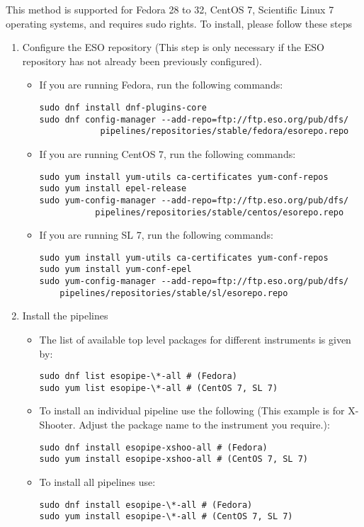  This method is supported for Fedora 28 to 32, CentOS 7,
 Scientific Linux 7 operating systems, and requires sudo rights. To install, please follow these steps

\begin{enumerate}

\item Configure the ESO repository (This step is only necessary if the ESO repository has not already been previously configured).
  \begin{itemize}
  \item If you are running Fedora, run the following commands:
\begin{verbatim}
sudo dnf install dnf-plugins-core
sudo dnf config-manager --add-repo=ftp://ftp.eso.org/pub/dfs/
            pipelines/repositories/stable/fedora/esorepo.repo
\end{verbatim}
\item If you are running CentOS 7, run the following commands:
\begin{verbatim}
sudo yum install yum-utils ca-certificates yum-conf-repos
sudo yum install epel-release
sudo yum-config-manager --add-repo=ftp://ftp.eso.org/pub/dfs/
           pipelines/repositories/stable/centos/esorepo.repo
\end{verbatim}
\item If you are running SL 7, run the following commands:
\begin{verbatim}
sudo yum install yum-utils ca-certificates yum-conf-repos
sudo yum install yum-conf-epel
sudo yum-config-manager --add-repo=ftp://ftp.eso.org/pub/dfs/
    pipelines/repositories/stable/sl/esorepo.repo
\end{verbatim}
  \end{itemize}

\item Install the pipelines
\begin{itemize}
\item The list of available top level packages for different instruments is given by:
\begin{verbatim}
sudo dnf list esopipe-\*-all # (Fedora)
sudo yum list esopipe-\*-all # (CentOS 7, SL 7)
\end{verbatim}
 
\item To install an individual pipeline use the following (This example is for X-Shooter. Adjust the package name to the instrument you require.):
\begin{verbatim}
sudo dnf install esopipe-xshoo-all # (Fedora)
sudo yum install esopipe-xshoo-all # (CentOS 7, SL 7)
\end{verbatim}

\item To install all pipelines use:
\begin{verbatim}
sudo dnf install esopipe-\*-all # (Fedora)
sudo yum install esopipe-\*-all # (CentOS 7, SL 7)
\end{verbatim}


\end{itemize}

\end{enumerate}


